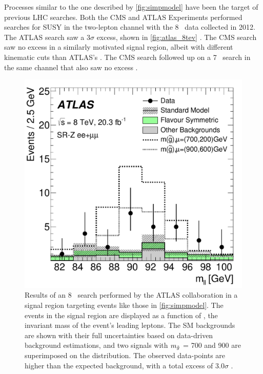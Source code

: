 Processes similar to the one described by \autoref{fig:simpmodel} have been the target of previous \ac{LHC} searches. Both the \ac{CMS} and \ac{ATLAS} Experiments performed searches for \ac{SUSY} in the two-lepton channel with the 8 \tev~data collected in 2012. The \ac{ATLAS} search saw a 3$\sigma$ excess, shown in \autoref{fig:atlas_8tev} \cite{SUSY-2014-10}. The \ac{CMS} search saw no excess in a similarly motivated signal region, albeit with different kinematic cuts than \ac{ATLAS}'s \cite{Chatrchyan:2012qka}. The \ac{CMS} search followed up on a 7 \tev~search in the same channel that also saw no excess \cite{CMS2}. 

\begin{centering}
\begin{figure}[!hbt]
\myfloatalign
\includegraphics[width=.9\linewidth]{figures/theory/figaux_12a.pdf}
\caption{ Results of an 8 \tev~search performed by the \ac{ATLAS} collaboration in a signal region targeting events like those in \autoref{fig:simpmodel}. The events in the signal region are displayed as a function of \mll, the invariant mass of the event's leading leptons. The \ac{SM} backgrounds are shown with their full uncertainties based on data-driven background estimations, and two signals with $m_{\tilde g}$ = 700 and 900 \gev are superimposed on the distribution. The observed data-points are higher than the expected background, with a total excess of 3.0$\sigma$ \cite{SUSY-2014-10}.}
\label{fig:atlas_8tev}
\end{figure}
\end{centering}

